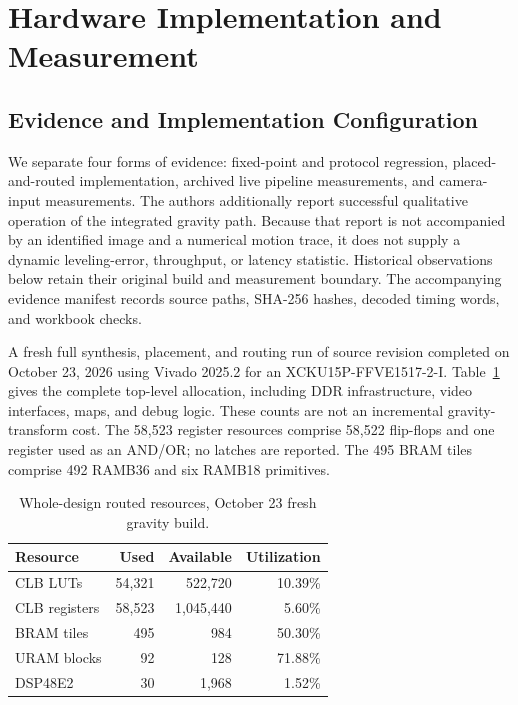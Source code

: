 \section{Hardware Implementation and Measurement}
\label{sec:hardware}

\subsection{Evidence and Implementation Configuration}
We separate four forms of evidence: fixed-point and protocol regression, placed-and-routed implementation, archived live pipeline measurements, and camera-input measurements. The authors additionally report successful qualitative operation of the integrated gravity path. Because that report is not accompanied by an identified image and a numerical motion trace, it does not supply a dynamic leveling-error, throughput, or latency statistic. Historical observations below retain their original build and measurement boundary. The accompanying evidence manifest records source paths, SHA-256 hashes, decoded timing words, and workbook checks.

A fresh full synthesis, placement, and routing run of source revision  completed on October 23, 2026 using Vivado 2025.2 for an XCKU15P-FFVE1517-2-I. Table~\ref{tab:hw_resources} gives the complete top-level allocation, including DDR infrastructure, video interfaces, maps, and debug logic. These counts are not an incremental gravity-transform cost. The 58,523 register resources comprise 58,522 flip-flops and one register used as an AND/OR; no latches are reported. The 495 BRAM tiles comprise 492 RAMB36 and six RAMB18 primitives.

\begin{table}[t]
\centering
\caption{Whole-design routed resources, October 23 fresh gravity build.}
\label{tab:hw_resources}
\small
\begin{tabular}{lrrr}
\toprule
Resource & Used & Available & Utilization \\
\midrule
CLB LUTs & 54,321 & 522,720 & 10.39\% \\
CLB registers & 58,523 & 1,045,440 & 5.60\% \\
BRAM tiles & 495 & 984 & 50.30\% \\
URAM blocks & 92 & 128 & 71.88\% \\
DSP48E2 & 30 & 1,968 & 1.52\% \\
\bottomrule
\end{tabular}
\end{table}

